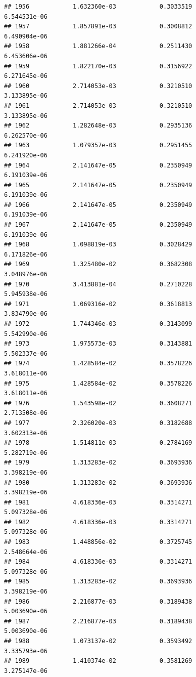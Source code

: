 \documentclass[
]{article}
\begin{document}
\begin{verbatim}
## 1956            1.632360e-03            0.3033519            6.544531e-06
## 1957            1.857891e-03            0.3008812            6.490904e-06
## 1958            1.881266e-04            0.2511430            6.453606e-06
## 1959            1.822170e-03            0.3156922            6.271645e-06
## 1960            2.714053e-03            0.3210510            3.133895e-06
## 1961            2.714053e-03            0.3210510            3.133895e-06
## 1962            1.282648e-03            0.2935136            6.262570e-06
## 1963            1.079357e-03            0.2951455            6.241920e-06
## 1964            2.141647e-05            0.2350949            6.191039e-06
## 1965            2.141647e-05            0.2350949            6.191039e-06
## 1966            2.141647e-05            0.2350949            6.191039e-06
## 1967            2.141647e-05            0.2350949            6.191039e-06
## 1968            1.098819e-03            0.3028429            6.171826e-06
## 1969            1.325480e-02            0.3682308            3.048976e-06
## 1970            3.413881e-04            0.2710228            5.945938e-06
## 1971            1.069316e-02            0.3618813            3.834790e-06
## 1972            1.744346e-03            0.3143099            5.542990e-06
## 1973            1.975573e-03            0.3143881            5.502337e-06
## 1974            1.428584e-02            0.3578226            3.618011e-06
## 1975            1.428584e-02            0.3578226            3.618011e-06
## 1976            1.543598e-02            0.3608271            2.713508e-06
## 1977            2.326020e-03            0.3182688            3.602313e-06
## 1978            1.514811e-03            0.2784169            5.282719e-06
## 1979            1.313283e-02            0.3693936            3.398219e-06
## 1980            1.313283e-02            0.3693936            3.398219e-06
## 1981            4.618336e-03            0.3314271            5.097328e-06
## 1982            4.618336e-03            0.3314271            5.097328e-06
## 1983            1.448856e-02            0.3725745            2.548664e-06
## 1984            4.618336e-03            0.3314271            5.097328e-06
## 1985            1.313283e-02            0.3693936            3.398219e-06
## 1986            2.216877e-03            0.3189438            5.003690e-06
## 1987            2.216877e-03            0.3189438            5.003690e-06
## 1988            1.073137e-02            0.3593492            3.335793e-06
## 1989            1.410374e-02            0.3581269            3.275147e-06

\end{verbatim}
\end{document}
